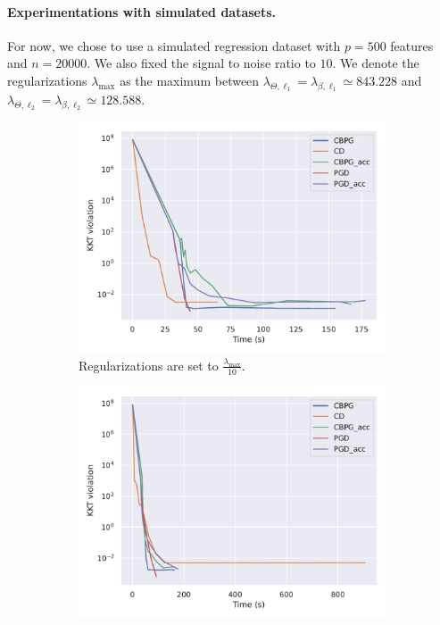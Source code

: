 \documentclass[a4]{article}
\begin{document}
\paragraph{Experimentations with simulated datasets.}

For now, we chose to use a simulated regression dataset with $p=500$ features and $n=20000$. We also fixed the signal to noise ratio to $10$.
We denote the regularizations $\lambda_{\max}$ as the maximum between $\lambda_{\Theta,\ell_1}=\lambda_{\beta, \ell_1}\simeq 843.228$ and $\lambda_{\Theta,\ell_2}=\lambda_{\beta, \ell_2}\simeq 128.588$.
\begin{figure}[ht!]
	\begin{subfigure}{.45\textwidth}
		\centering
		\includegraphics[scale = 0.38]{prebuilt_images/simulated_n20000p500_kkt_snr10.pdf}
		\caption{Regularizations are set to $\frac{\lambda_{\max}}{10}$.}
		\label{fig:simu_ccl}
	\end{subfigure}
	\begin{subfigure}{.45\textwidth}
		\centering
		\includegraphics[scale = 0.38]{prebuilt_images/simulated_n20000p500_kkt_snr10_over100.pdf}

\end{subfigure}
\end{figure}
\end{document}

